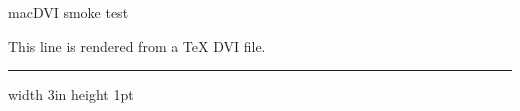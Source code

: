 \hsize=4.5in
\vsize=6in
\nopagenumbers

macDVI smoke test

\bigskip
This line is rendered from a TeX DVI file.

\medskip
\hrule width 3in height 1pt

\bye
